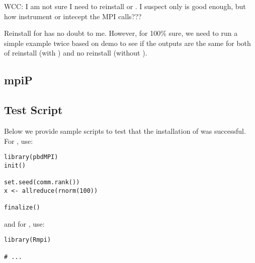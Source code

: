 {\color{red}
  WCC: I am not sure I need to reinstall  or
 . I suspect only  is good enough, but how
  instrument or intecept the MPI calls???

 Reinstall for  has no doubt to me. However, for 100\% sure,
 we need to run a simple example twice based on  demo
 to see if the outputs are the same for both of reinstall 
 (with ) and
 no reinstall  (without ).
}


\subsection{mpiP}


\subsection{Test Script}

Below we provide sample scripts to test that the installation of  was successful.  For , use:
\begin{lstlisting}[title=Test script for pbdMPI]
library(pbdMPI)
init()

set.seed(comm.rank())
x <- allreduce(rnorm(100))

finalize()
\end{lstlisting}
and for , use:
\begin{lstlisting}[title=Test script for pbdMPI]
library(Rmpi)

# ...
\end{lstlisting}
